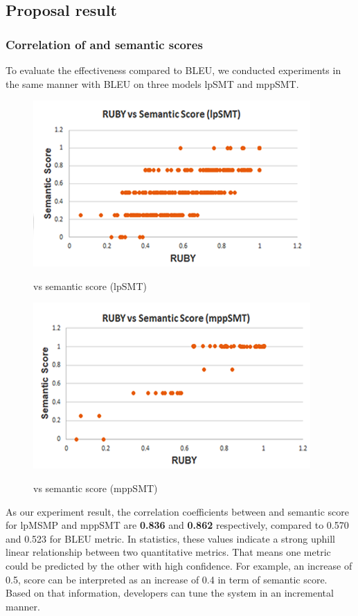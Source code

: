 \subsection{Proposal result}
\subsubsection{Correlation of {\model} and semantic scores}
To evaluate the effectiveness {\model} compared to BLEU, we conducted experiments 
in the same manner with BLEU on three models lpSMT and mppSMT. 

\begin{figure}[t]
\caption{{\model} vs semantic score (lpSMT)}
\centering
\includegraphics{img/rubyvssem_lpSMT.png}
\label{fig:RubySemlpSMT}
\end{figure}

\begin{figure}[t]
\caption{{\model} vs semantic score (mppSMT)}
\centering
\includegraphics{img/rubyvssem_mppSMT.png}
\label{fig:RubySemMppSMT}
\end{figure}

As our experiment result, the correlation coefficients between {\model} and
semantic score for lpMSMP and mppSMT are \textbf{0.836} and \textbf{0.862}
respectively, compared to 0.570 and 0.523 for BLEU metric. In statistics, 
these values indicate a strong uphill linear relationship between two 
quantitative metrics. That means one metric could be predicted by the other 
with high confidence. For example, an increase of 0.5, {\model} score can be 
interpreted as an increase of 0.4 in term of semantic score. Based on that 
information, developers can tune the system in an incremental manner.

